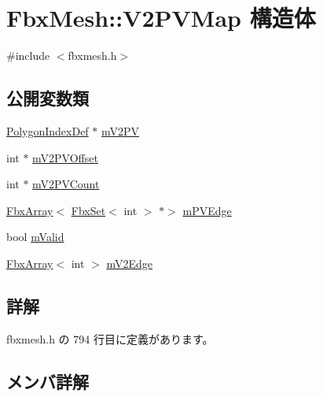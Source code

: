 \hypertarget{struct_fbx_mesh_1_1_v2_p_v_map}{}\section{Fbx\+Mesh\+:\+:V2\+P\+V\+Map 構造体}
\label{struct_fbx_mesh_1_1_v2_p_v_map}


{\ttfamily \#include $<$fbxmesh.\+h$>$}

\subsection*{公開変数類}
\begin{DoxyCompactItemize}
\item 
\hyperlink{struct_fbx_mesh_1_1_polygon_index_def}{Polygon\+Index\+Def} $\ast$ \hyperlink{struct_fbx_mesh_1_1_v2_p_v_map_a4676680c4b8c77765146fa593a0c0c39}{m\+V2\+PV}
\item 
int $\ast$ \hyperlink{struct_fbx_mesh_1_1_v2_p_v_map_a607eb9cd4d49d0aa8eb042d780a837a3}{m\+V2\+P\+V\+Offset}
\item 
int $\ast$ \hyperlink{struct_fbx_mesh_1_1_v2_p_v_map_a363c86f22765354ebe81bb70e6917895}{m\+V2\+P\+V\+Count}
\item 
\hyperlink{class_fbx_array}{Fbx\+Array}$<$ \hyperlink{class_fbx_set}{Fbx\+Set}$<$ int $>$ $\ast$$>$ \hyperlink{struct_fbx_mesh_1_1_v2_p_v_map_a976d500c6eb198b4e55548767de9828c}{m\+P\+V\+Edge}
\item 
bool \hyperlink{struct_fbx_mesh_1_1_v2_p_v_map_a23599f521bff9cdaf5da7c5ee403b0cc}{m\+Valid}
\item 
\hyperlink{class_fbx_array}{Fbx\+Array}$<$ int $>$ \hyperlink{struct_fbx_mesh_1_1_v2_p_v_map_a93e02e4ff4a27a317d7289db36d5b5a9}{m\+V2\+Edge}
\end{DoxyCompactItemize}


\subsection{詳解}


 fbxmesh.\+h の 794 行目に定義があります。



\subsection{メンバ詳解}
\mbox{\label{struct_fbx_mesh_1_1_v2_p_v_map_a976d500c6eb198b4e55548767de9828c}} 
